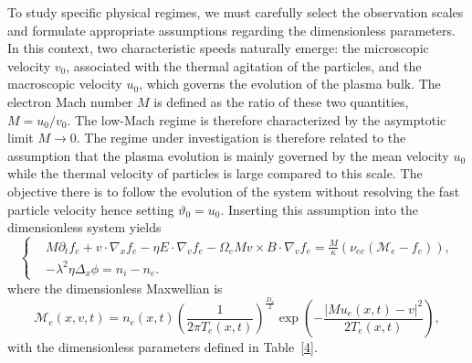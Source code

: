\documentclass[pdflatex,final,10pt]{article}
\newcommand{\Fabrice}[1]{#1}
\newcommand{\Del}[1]{#1}
\begin{document}
 
\Fabrice{To study specific physical regimes, we must carefully select the observation scales and formulate appropriate assumptions regarding the dimensionless parameters. In this context, two characteristic speeds naturally emerge: the microscopic velocity $v_0$, associated with the thermal agitation of the particles, and the macroscopic velocity $u_0$, which governs the evolution of the plasma bulk. The electron Mach number $M$ is defined as the ratio of these two quantities, $M = u_0 / v_0$. The low-Mach regime is therefore characterized by the asymptotic limit $M \to 0$. The regime under investigation is therefore related to the assumption that the plasma evolution is mainly governed by the mean velocity $u_0$ while the thermal velocity of particles is large compared to this scale. The objective there is to follow the evolution of the system without resolving the fast particle velocity hence setting $\vartheta_0= u_0$. Inserting this assumption into the dimensionless system yields}
\begin{equation} \label{5}
    \left \{
    \begin{aligned}
        &M\partial_{t}f_e+v\cdot\nabla_{x}f_e-\eta E\cdot \nabla_{v}f_e-\Omega_{e}Mv\times B\cdot \nabla_{v}f_e=\frac{M}{\kappa}\left(\nu_{ee}(\Del{\mathcal{M}_{e}}-f_e) \right),\\
        &-\lambda^{2}\eta\Delta_{x}\phi=n_{i}-n_e.
    \end{aligned}
    \right.
\end{equation}
where the dimensionless Maxwellian is
\begin{equation*}
    \mathcal{M}_{e}(x,v,t)=n_e(x,t)\left(\frac{1}{2\pi T_e(x,t)}\right)^{\frac{D_v}{2}}
    \exp\left( -\frac{|Mu_e(x,t)-v|^{2}}{2T_e(x,t)}\right),
\end{equation*}
with the dimensionless parameters defined in Table~\ref{4}.
\end{document}
